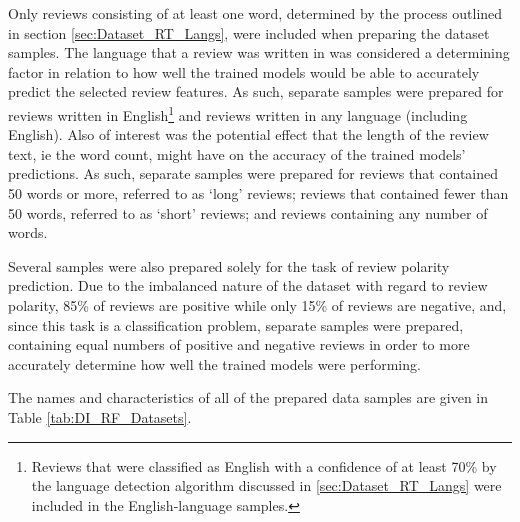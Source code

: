 Only reviews consisting of at least one word, determined by the process outlined in section \ref{sec:Dataset_RT_Langs}, were included when preparing the dataset samples. The language that a review was written in was considered a determining factor in relation to how well the trained models would be able to accurately predict the selected review features. As such, separate samples were prepared for reviews written in English\footnote{Reviews that were classified as English with a confidence of at least 70\% by the language detection algorithm discussed in \ref{sec:Dataset_RT_Langs} were included in the English-language samples.} and reviews written in any language (including English). Also of interest was the potential effect that the length of the review text, ie the word count, might have on the accuracy of the trained models' predictions. As such, separate samples were prepared for reviews that contained 50 words or more, referred to as `long' reviews; reviews that contained fewer than 50 words, referred to as `short' reviews; and reviews containing any number of words.

Several samples were also prepared solely for the task of review polarity prediction. Due to the imbalanced nature of the dataset with regard to review polarity, 85\% of reviews are positive while only 15\% of reviews are negative, and, since this task is a classification problem, separate samples were prepared, containing equal numbers of positive and negative reviews in order to more accurately determine how well the trained models were performing.

The names and characteristics of all of the prepared data samples are given in Table \ref{tab:DI_RF_Datasets}.

